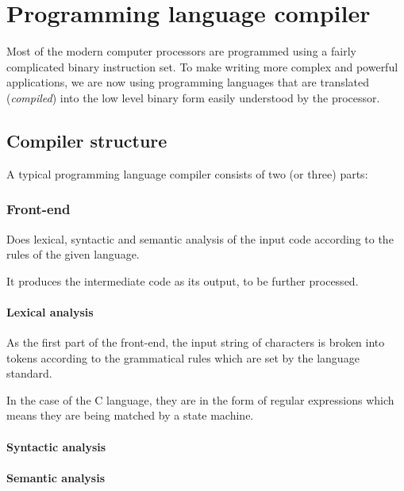 \chapter{Programming language compiler}

Most of the modern computer processors are programmed using a fairly complicated binary instruction set. To make writing more complex and powerful applications, we are now using programming languages that are translated (\emph{compiled}) into the low level binary form easily understood by the processor.

    \section{Compiler structure}

    A typical programming language compiler consists of two (or three) parts:

        \subsection{Front-end}

            Does lexical, syntactic and semantic analysis of the input code according to the rules of the given language.

            It produces the intermediate code as its output, to be further processed.

            \subsubsection{Lexical analysis}

                As the first part of the front-end, the input string of characters is broken into tokens according to the grammatical rules which are set by the language standard.

                In the case of the C language, they are in the form of regular expressions which means they are being matched by a state machine.

            \subsubsection{Syntactic analysis}

                
            \subsubsection{Semantic analysis}
            

